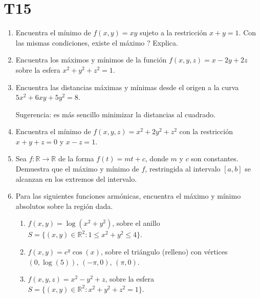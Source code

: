 \documentclass{article}
\theoremstyle{definition}
\begin{document}
  \section*{T15 }

  
  
	\begin{enumerate}


          
        \item Encuentra el m\'inimo de $f(x,y)=xy$ sujeto a la
          restricci\'on $x+y=1$. \textquestiondown Con las
          mismas condiciones, existe el m\'aximo ? Explica.
          
        \item Encuentra los m\'aximos y m\'inimos de la funci\'on
          $f(x,y,z)=x-2y+2z$ sobre la esfera $x^2+y^2+z^2=1$.

          
        \item Encuentra las distancias m\'aximas y m\'inimas 
          desde el origen a la curva $5x^2+6xy+5y^2=8$.

          Sugerencia: es m\'as sencillo minimizar la distancias al cuadrado.


    
        \item Encuentra el m\'inimo de $f(x,y,z)=x^2+2y^2+z^2$ con
          la restricci\'on $x+y+z=0$ y $x-z=1$.

		
		\item Sea $f:\mathbb{R}\to \mathbb{R}$ de la forma $f(t)=mt+c$, donde
		$m$ y $c$ son constantes. Demuestra que el m\'aximo y m\'inimo de
		$f$, restringida al intervalo $[a,b]$ se alcanzan en los extremos del intervalo.
          
        \item Para las siguientes funciones arm\'onicas, encuentra
          el m\'aximo y m\'inimo absolutos sobre la regi\'on dada.

          \begin{enumerate}
         
          \item $f(x,y)=\log(x^2+y^2)$, sobre el anillo
            $S=\{(x,y)\in \mathbb{R}^2:  1\leq  x^2+y^2\leq 4\}$.
          \item $f(x,y)=e^y\cos(x)$, sobre el tri\'angulo (relleno)
            con v\'ertices $(0,\log(5))$, $(-\pi,0)$, $(\pi,0)$.

             \item $f(x,y,z)=x^2-y^2+z$, sobre la esfera
            $S=\{(x,y)\in \mathbb{R}^2: x^2+y^2+z^2=1\}$.
            

\end{enumerate}
\end{enumerate}
\end{document}
